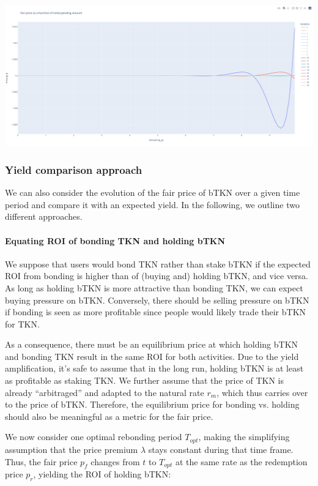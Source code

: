 \documentclass{article}
\begin{document}
\includegraphics[width=\linewidth]{./ChickenBonds_Whitepaper_recursive_price_2.png}

\subsubsection{Yield comparison approach}
We can also consider the evolution of the fair price of bTKN over a given time period and compare it with an expected yield. In the following, we outline two different approaches.

\paragraph{Equating ROI of bonding TKN and holding bTKN}
We suppose that users would bond TKN rather than stake bTKN if the expected ROI from bonding is higher than of (buying and) holding bTKN, and vice versa. As long as holding bTKN is more attractive than bonding TKN, we can expect buying pressure on bTKN. Conversely, there should be selling pressure on bTKN if bonding is seen as more profitable since people would likely trade their bTKN for TKN. 

As a consequence, there must be an equilibrium price at which holding bTKN and bonding TKN result in the same ROI for both activities. Due to the yield amplification, it's safe to assume that in the long run, holding bTKN is at least as profitable as staking TKN. We further assume that the price of TKN is already “arbitraged” and adapted to the natural rate $r_m$, which thus carries over to the price of bTKN. Therefore, the equilibrium price for bonding vs. holding should also be meaningful as a metric for the fair price.

We now consider one optimal rebonding period $T_{opt}$, making the simplifying assumption that the price premium $\lambda$ stays constant during that time frame. Thus, the fair price $p_f$ changes from $t$ to $T_{opt}$ at the same rate as the redemption price $p_r$, yielding the ROI of holding bTKN:
\end{document}
